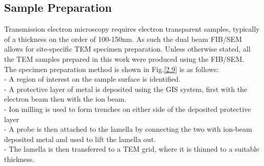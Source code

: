 \subsection{Sample Preparation}
Transmission electron microscopy  requires electron transparent samples, typically of a thickness on the order of 100-150nm. As such the dual beam FIB/SEM allows for site-specific TEM specimen preparation. Unless otherwise stated, all the TEM samples prepared in this work were produced using the FIB/SEM.\\
The specimen preparation method is shown in Fig.\ref{2.9} is as follows:\\
\indent - A region of interest on the sample surface is identified.\\
\indent - A protective layer of metal is deposited using the GIS system, first with the electron beam then with the ion beam.\\
\indent - Ion milling is used to form trenches on either side of the deposited protective layer\\
\indent - A probe is then attached to the lamella by connecting the two with ion-beam deposited metal and used to lift the lamella out.\\
\indent - The lamella is then transferred to a TEM grid, where it is thinned to a suitable thickness.


